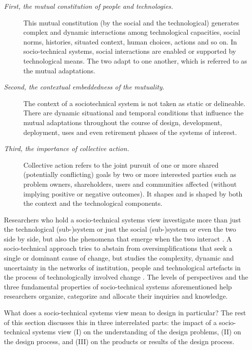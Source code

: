 \begin{description}
\item[\textit{First, the mutual constitution of people and technologies.}] 
This mutual constitution (by the social and the technological) generates complex and dynamic interactions among technological capacities, social norms, histories, situated context, human choices, actions and so on. In socio-technical systems, social interactions are enabled or supported by technological means. The two adapt to one another, which is referred to as the mutual adaptations. 
%
\item[\textit{Second, the contextual embeddedness of the mutuality.}] 
The context of a sociotechnical system is not taken as static or delineable. There are dynamic situational and temporal conditions that influence 
the mutual adaptations throughout the course of design, development, deployment, uses and even retirement phases of the systems of interest. 
%
\item[\textit{Third, the importance of collective action.}] 
Collective action refers to the joint pursuit of one or more shared (potentially conflicting) goals by two or more interested parties such as problem owners, shareholders, users  and communities affected (without implying positive or negative outcomes). It shapes and is shaped by both the context and the technological components. 
\end{description}
%
%
Researchers who hold a socio-technical systems view investigate more than just the technological (sub-)system or just the social (sub-)system or even the two side by side, but also the phenomena that emerge when the two interact \cite{Lee2001}. A socio-technical approach tries to abstain from oversimplifications that seek a single or dominant cause of change, but studies the complexity, dynamic and uncertainty in the networks of institution, people and technological artefacts in the process of technologically involved change \cite{Sawyer2014}. 
%
The levels of perspectives and the three fundamental properties of socio-technical systems aforementioned help researchers organize, categorize and allocate their inquiries and knowledge. 

What does a socio-technical systems view mean to design in particular? The rest of this section discusses this in three interrelated parts: the impact of a socio-technical systems view
(I) on the understanding of the design problems, (II) on the design process, and (III) on the products or results of the design process.

